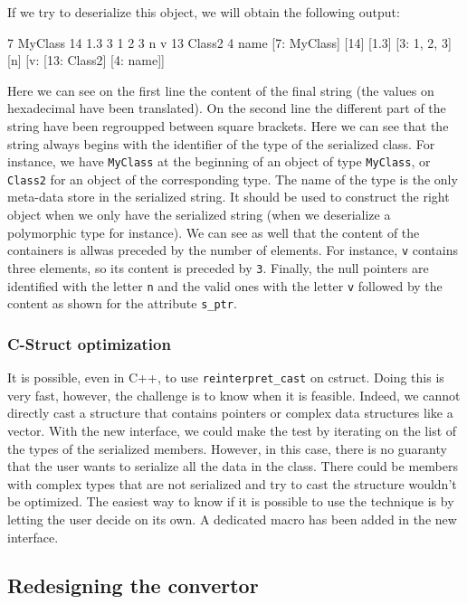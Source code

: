 If we try to deserialize this object, we will obtain the following output:

\begin{format}
  7 MyClass 14 1.3 3 1 2 3 n v 13 Class2 4 name
  [7: MyClass] [14] [1.3] [3: 1, 2, 3] [n] [v: [13: Class2] [4: name]]
\end{format}\leavevmode\newline

Here we can see on the first line the content of the final string (the values on
hexadecimal have been translated). On the second line the different part of the
string have been regroupped between square brackets. Here we can see that the
string always begins with the identifier of the type of the serialized class.
For instance, we have \texttt{MyClass} at the beginning of an object of type
\texttt{MyClass}, or \texttt{Class2} for an object of the corresponding type.
The name of the type is the only meta-data store in the serialized string. It
should be used to construct the right object when we only have the serialized
string (when we deserialize a polymorphic type for instance). We can see as well
that the content of the containers is allwas preceded by the number of elements.
For instance, \texttt{v} contains three elements, so its content is preceded by
\texttt{3}. Finally, the null pointers are identified with the letter \texttt{n}
and the valid ones with the letter \texttt{v} followed by the content as shown
for the attribute \texttt{s\_ptr}.

\subsubsection{C-Struct optimization}

It is possible, even in C++, to use \texttt{reinterpret\_cast} on \gls{cstruct}.
Doing this is very fast, however, the challenge is to know when it is feasible.
Indeed, we cannot directly cast a structure that contains pointers or complex
data structures like a vector. With the new interface, we could make the test by
iterating on the list of the types of the serialized members. However, in this
case, there is no guaranty that the user wants to serialize all the data in the
class. There could be members with complex types that are not serialized and try
to cast the structure wouldn't be optimized. The easiest way to know if it is
possible to use the technique is by letting the user decide on its own. A
dedicated macro has been added in the new interface.

\subsection{Redesigning the convertor}
\label{sec:convertor}

